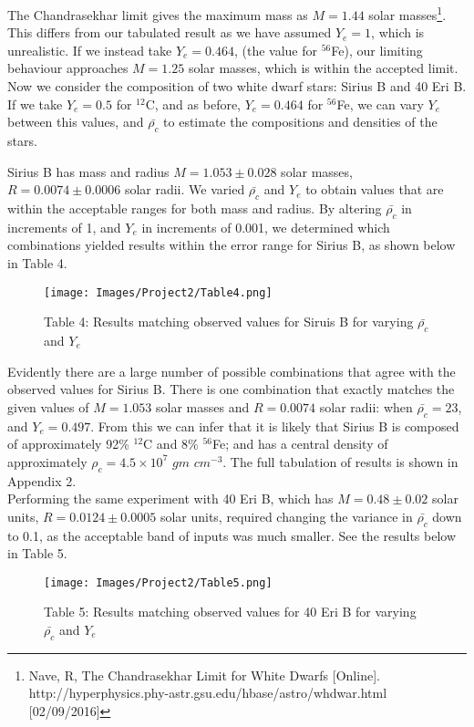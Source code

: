 \documentclass[10pt]{article}
\begin{document}
{The Chandrasekhar limit gives the maximum mass as $M = 1.44$ solar masses\footnote{Nave, R, The Chandrasekhar Limit for White Dwarfs [Online]. http://hyperphysics.phy-astr.gsu.edu/hbase/astro/whdwar.html [02/09/2016]}. This differs from our tabulated result as we have assumed $Y_e = 1$, which is unrealistic. If we instead take $Y_e = 0.464$, (the value for $^{56}$Fe), our limiting behaviour approaches $M = 1.25$ solar masses, which is within the accepted limit. \\

Now we consider the composition of two white dwarf stars: Sirius B and 40 Eri B. If we take $Y_e = 0.5$ for $^{12}$C, and as before, $Y_e = 0.464$ for $^{56}$Fe, we can vary $Y_e$ between this values, and $\bar{\rho_c}$ to estimate the compositions and densities of the stars.

Sirius B has mass and radius $M = 1.053 \pm 0.028$ solar masses, $R = 0.0074 \pm 0.0006$ solar radii. We varied $\bar{\rho_c}$ and $Y_e$ to obtain values that are within the acceptable ranges for both mass and radius. By altering $\bar{\rho_c}$ in increments of 1, and $Y_e$ in increments of 0.001, we determined which combinations yielded results within the error range for Sirius B, as shown below in Table 4.

\begin{figure}[h]
\texttt{[image: Images/Project2/Table4.png]} \centering \caption*{\footnotesize Table 4: Results matching observed values for Siruis B for varying $\bar{\rho_c}$ and $Y_e$} \end{figure}

Evidently there are a large number of possible combinations that agree with the observed values for Sirius B. There is one combination that exactly matches the given values of $M = 1.053$ solar masses and $R = 0.0074$ solar radii: when $\bar{\rho_c} = 23$, and $Y_e = 0.497$. From this we can infer that it is likely that Sirius B is composed of approximately 92\% $^{12}$C and 8\% $^{56}$Fe; and has a central density of approximately $\rho_c = 4.5 \times 10^7$ $gm$ $cm^{-3}$. The full tabulation of results is shown in Appendix 2. \\

Performing the same experiment with 40 Eri B, which has $M = 0.48 \pm 0.02$ solar units, $R = 0.0124 \pm 0.0005$ solar units, required changing the variance in $\bar{\rho_c}$ down to 0.1, as the acceptable band of inputs was much smaller. See the results below in Table 5.

\begin{figure}[h!]
\texttt{[image: Images/Project2/Table5.png]} \centering \caption*{\footnotesize Table 5: Results matching observed values for 40 Eri B for varying $\bar{\rho_c}$ and $Y_e$} \end{figure}

}
\end{document}
